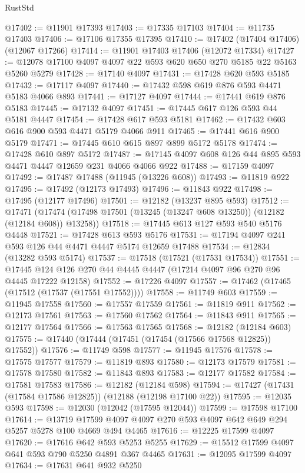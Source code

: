 \begin{lexlean}{RustStd}
\begin{coremodule}
@17402 := @11901 @17393
@17403 := @17335 @17103
@17404 := @11735 @17403
@17406 := @17106 @17355 @17395
@17410 := @17402 (@17404 @17406) (@12067 @17266)
@17414 := @11901 @17403 @17406 (@12072 @17334)
@17427 := @12078 @17100 @4097 @4097 @22 @593 @620 @650 @270 @5185 @22 @5163 @5260 @5279
@17428 := @17140 @4097
@17431 := @17428 @620 @593 @5185
@17432 := @17117 @4097
@17440 := @17432 @598 @619 @876 @593 @4471 @5183 @4066 @893
@17441 := @17127 @4097
@17444 := @17441 @619 @876 @5183
@17445 := @17132 @4097
@17451 := @17445 @617 @126 @593 @44 @5181 @4447
@17454 := @17428 @617 @593 @5181
@17462 := @17432 @603 @616 @900 @593 @4471 @5179 @4066 @911
@17465 := @17441 @616 @900 @5179
@17471 := @17445 @610 @615 @897 @899 @5172 @5178
@17474 := @17428 @610 @897 @5172
@17487 := @17145 @4097 @608 @126 @44 @895 @593 @4471 @4447 @12659 @231 @4066 @4066 @922
@17488 := @17159 @4097
@17492 := @17487 @17488 (@11945 (@13226 @608))
@17493 := @11819 @922
@17495 := @17492 (@12173 @17493)
@17496 := @11843 @922
@17498 := @17495 (@12177 @17496)
@17501 := @12182 (@13237 @895 @593)
@17512 := @17471
    (@17474 (@17498 @17501 (@13245 (@13247 @608 @13250)) (@12182 (@12184 @608)) @13258))
@17518 := @17445 @613 @127 @593 @540 @5176 @4448
@17521 := @17428 @613 @593 @5176
@17531 := @17194 @4097 @241 @593 @126 @44 @4471 @4447 @5174 @12659 @17488
@17534 := @12834 (@13282 @593 @5174)
@17537 := @17518 (@17521 (@17531 @17534))
@17551 := @17445 @124 @126 @270 @44 @4445 @4447 (@17214 @4097 @96 @270 @96 @4445 @17222 @12158)
@17552 := @17226 @4097
@17557 := @17462 (@17465 (@17512 (@17537 (@17551 @17552))))
@17558 := @11749 @603
@17559 := @11945 @17558
@17560 := @17557 @17559
@17561 := @11819 @911
@17562 := @12173 @17561
@17563 := @17560 @17562
@17564 := @11843 @911
@17565 := @12177 @17564
@17566 := @17563 @17565
@17568 := @12182 (@12184 @603)
@17575 := @17440 (@17444 (@17451 (@17454 (@17566 @17568 @12825)) @17552))
@17576 := @11749 @598
@17577 := @11945 @17576
@17578 := @17575 @17577
@17579 := @11819 @893
@17580 := @12173 @17579
@17581 := @17578 @17580
@17582 := @11843 @893
@17583 := @12177 @17582
@17584 := @17581 @17583
@17586 := @12182 (@12184 @598)
@17594 := @17427 (@17431 (@17584 @17586 @12825)) (@12188 (@12198 @17100 @22))
@17595 := @12035 @593
@17598 := @12030 (@12042 (@17595 @12044))
@17599 := @17598 @17100
@17614 := @13719 @17599 @4097 @4097 @270 @593 @4097 @642 @649 @294 @5257 @5278 @100 @4669 @494 @4465
@17616 := @12225 @17599 @4097
@17620 := @17616 @642 @593 @5253 @5255
@17629 := @15512 @17599 @4097 @641 @593 @790 @5250 @4891 @367 @4465
@17631 := @12095 @17599 @4097
@17634 := @17631 @641 @932 @5250

\end{coremodule}
\end{lexlean}
